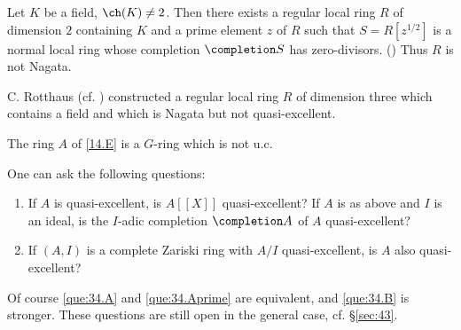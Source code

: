 \documentclass[../main]{subfiles}
\begin{document}
Let $K$ be a field, $\ch(K) \ne 2$. Then there exists a regular local ring $R$ of dimension $2$ containing $K$ and a prime element $z$ of $R$ such that $S = R[z^{1/2}]$ is a normal local ring whose completion $\completion S$ has zero-divisors. (\cite[p.210, (E7.1)]{nagata1975local}) Thus $R$ is not Nagata.

C. Rotthaus (cf. \cite{rotthaus1977nicht}) constructed a regular local ring $R$ of dimension three which contains a field and which is Nagata but not quasi-excellent. 

The ring $A$ of \ref{14.E} is a $G$-ring which is not u.c. 

\newparagraph One can ask the following questions:

\begin{enumerate}[label=(\Alph*)]
    \item\label{que:34.A} If $A$ is quasi-excellent, is $A[[X]]$ quasi-excellent?
    \myitem[(A')]\label{que:34.Aprime} If $A$ is as above and $I$ is an ideal, is the $I$-adic completion $\completion A$ of $A$ quasi-excellent? 
    \setcounter{enumi}{1}
    \item If $(A,I)$ is a complete Zariski ring with $A/I$ quasi-excellent, is $A$ also quasi-excellent?\label{que:34.B}
\end{enumerate}

Of course \ref{que:34.A} and \ref{que:34.Aprime} are equivalent, and \ref{que:34.B} is stronger. These questions are still open in the general case, cf. \S\ref{sec:43}.
\end{document}
